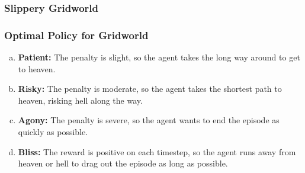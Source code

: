 \begin{frame}
    \frametitle{Slippery Gridworld}
    
\end{frame}

\begin{frame}
    \frametitle{Optimal Policy for Gridworld}
    
    \vspace{-1.3cm}
    \pause
    \begin{enumerate}[(a)]
        \item \textbf{Patient:} The penalty is slight, so the agent takes the long way around to get to heaven.
        \pause
        \item \textbf{Risky:} The penalty is moderate, so the agent takes the shortest path to heaven, risking hell
        along the way.
        \pause
        \item \textbf{Agony:} The penalty is severe, so the agent wants to end the episode as quickly as possible.
        \pause
        \item \textbf{Bliss:} The reward is positive on each timestep, 
		so the agent runs away from heaven or hell to drag out the episode as long as possible.  
    \end{enumerate}
\end{frame}

